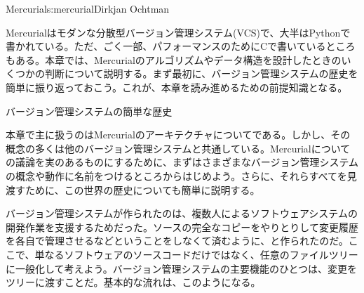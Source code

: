 \begin{aosachapter}{Mercurial}{s:mercurial}{Dirkjan Ochtman}

Mercurialはモダンな分散型バージョン管理システム(VCS)で、大半はPythonで書かれている。ただ、ごく一部、パフォーマンスのためにCで書いているところもある。本章では、Mercurialのアルゴリズムやデータ構造を設計したときのいくつかの判断について説明する。まず最初に、バージョン管理システムの歴史を簡単に振り返っておこう。これが、本章を読み進めるための前提知識となる。

\begin{aosasect1}{バージョン管理システムの簡単な歴史}

本章で主に扱うのはMercurialのアーキテクチャについてである。しかし、その概念の多くは他のバージョン管理システムと共通している。Mercurialについての議論を実のあるものにするために、まずはさまざまなバージョン管理システムの概念や動作に名前をつけるところからはじめよう。さらに、それらすべてを見渡すために、この世界の歴史についても簡単に説明する。

バージョン管理システムが作られたのは、複数人によるソフトウェアシステムの開発作業を支援するためだった。ソースの完全なコピーをやりとりして変更履歴を各自で管理させるなどということをしなくて済むように、と作られたのだ。ここで、単なるソフトウェアのソースコードだけではなく、任意のファイルツリーに一般化して考えよう。バージョン管理システムの主要機能のひとつは、変更をツリーに渡すことだ。基本的な流れは、このようになる。


\end{aosasect1}
\end{aosachapter}
